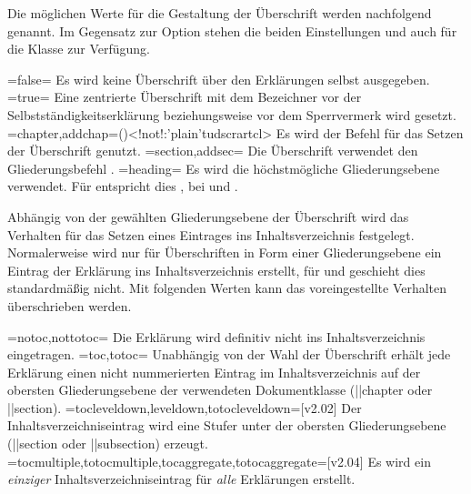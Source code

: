 \begin{DeclareEntity*}{}
\begin{DeclareEntity*}{}
\begin{DeclareEntity*}{}
\begin{Declaration}
Die möglichen Werte für die Gestaltung der Überschrift werden nachfolgend 
genannt. Im Gegensatz zur Option  stehen die beiden 
Einstellungen  und  auch für 
die Klasse  zur Verfügung.%
%
\begin{DeclareValues}
\itemval=false=
  Es wird keine Überschrift über den Erklärungen selbst ausgegeben.
\itemval*=true=
  Eine zentrierte Überschrift mit dem Bezeichner  vor 
  der Selbstständigkeitserklärung beziehungsweise  vor dem 
  Sperrvermerk wird gesetzt. 
\itemval=chapter,addchap=()<!not!:\Class'plain'{tudscrartcl}>
  Es wird der Befehl  für das Setzen der Überschrift genutzt. 
\itemval=section,addsec=
  Die Überschrift verwendet den Gliederungsbefehl .
\itemval=heading=
  Es wird die höchstmögliche Gliederungsebene verwendet. Für 
   entspricht dies , bei 
   und  .
\end{DeclareValues}

Abhängig von der gewählten Gliederungsebene der Überschrift wird das Verhalten 
für das Setzen eines Eintrages ins Inhaltsverzeichnis festgelegt. Normalerweise 
wird nur für Überschriften in Form einer Gliederungsebene ein Eintrag der 
Erklärung ins Inhaltsverzeichnis erstellt, für  und 
 geschieht dies standardmäßig nicht. Mit folgenden 
Werten kann das voreingestellte Verhalten überschrieben werden.%
%
\begin{DeclareValues}
\itemval=notoc,nottotoc=
  Die Erklärung wird definitiv nicht ins Inhaltsverzeichnis eingetragen.
\itemval=toc,totoc=
  Unabhängig von der Wahl der Überschrift erhält jede Erklärung einen nicht
  nummerierten Eintrag im Inhaltsverzeichnis auf der obersten Gliederungsebene 
  der verwendeten Dokumentklasse (\Macro||{chapter} oder \Macro||{section}). 
\itemval=tocleveldown,leveldown,totocleveldown=[v2.02]
  Der Inhaltsverzeichniseintrag wird eine Stufer unter der obersten 
  Gliederungsebene (\Macro||{section} oder \Macro||{subsection}) erzeugt.
\itemval=tocmultiple,totocmultiple,tocaggregate,totocaggregate=[v2.04]
  Es wird ein \emph{einziger} Inhaltsverzeichniseintrag für \emph{alle} 
  Erklärungen erstellt.
\end{DeclareValues}


\end{Declaration}
\end{DeclareEntity*}
\end{DeclareEntity*}
\end{DeclareEntity*}
